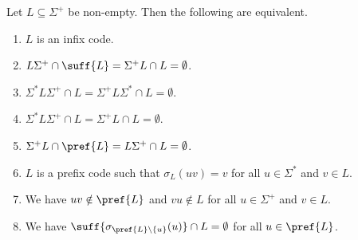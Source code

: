 \begin{proposition} \label{constrsync:prop:infix-code}
	Let $L \subseteq \Sigma^+$ be non-empty. Then the following are equivalent.
	\begin{enumerate}	
		\item \label{constrsync:prop:infix-code:1} $L$ is an infix code.	
		
		\item \label{constrsync:prop:infix-code:3} $L \Sigma^+ \cap \suff{L} = \Sigma^+ L \cap L = \emptyset$.
		
		\item \label{constrsync:prop:infix-code:4} $\Sigma^* L \Sigma^+ \cap L = \Sigma^+ L \Sigma^* \cap L = \emptyset$.
		
		\item \label{constrsync:prop:infix-code:5} $\Sigma^* L \Sigma^+ \cap L = \Sigma^+ L \cap L = \emptyset$.		
		
		\item \label{constrsync:prop:infix-code:2} $\Sigma^+ L \cap \pref{L} = L \Sigma^+ \cap L = \emptyset$.
		
		\item \label{constrsync:prop:infix-code:6} $L$ is a prefix code such that $\sigma_L(uv) = v$ for all $u \in \Sigma^*$ and $v \in L$.
			
		\item \label{constrsync:prop:infix-code:8} We have $uv \notin \pref{L}$
		and $vu \notin L$ for all $u \in \Sigma^+$ and $v \in L$.
				
		\item \label{constrsync:prop:infix-code:9} We have $\suff{\sigma_{\pref{L}\setminus\{u\}}(u)} \cap L = \emptyset$ for all $u \in \pref{L}$.
	\end{enumerate}
\end{proposition}
